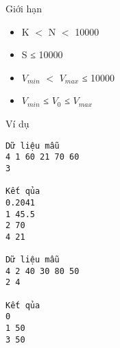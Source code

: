 Giới hạn
\begin{itemize}
	\item     K $<$ N $<$ 10000   
	\item     S ≤ 10000   
	\item     $V_{min}$    $<$ $V_{max}$    ≤ 10000   
	\item     $V_{min}$    ≤ $V_{0}$    ≤ $V_{max}$
\end{itemize}
Ví dụ
\begin{verbatim}
Dữ liệu mẫu
4 1 60 21 70 60
3

Kết qủa
0.2041
1 45.5
2 70
4 21

Dữ liệu mẫu
4 2 40 30 80 50
2 4

Kết qủa
0
1 50
3 50
\end{verbatim}